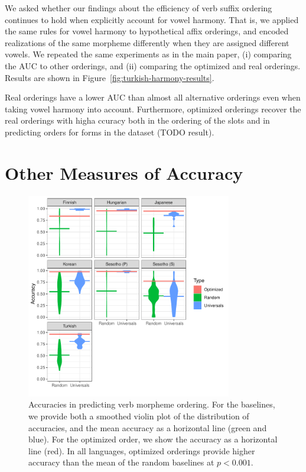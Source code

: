 \documentclass[11pt,letterpaper]{article}
\newcommand\mhahn[1]{{\color{red}(#1)}}
\begin{document}
We asked whether our findings about the efficiency of verb suffix ordering continues to hold when explicitly account for vowel harmony.
That is, we applied the same rules for vowel harmony to hypothetical affix orderings, and encoded realizations of the same morpheme differently when they are assigned different vowels.
We repeated the same experiments as in the main paper, (i) comparing the AUC to other orderings, and (ii) comparing the optimized and real orderings.
Results are shown in Figure~\ref{fig:turkish-harmony-results}.

Real orderings have a lower AUC than almost all alternative orderings even when taking vowel harmony into account.
Furthermore, optimized orderings recover the real orderings with higha ccuracy both in the ordering of the slots and in predicting orders for forms in the dataset \mhahn{TODO result}.


\section{Other Measures of Accuracy}



\begin{figure}[]
    \centering
\includegraphics[width=0.8\textwidth]{figures/accuracies_verbs.pdf}
    \caption{Accuracies in predicting verb morpheme ordering.
    For the baselines, we provide both a smoothed violin plot of the distribution of accuracies, and the mean accuracy as a horizontal line (green and blue). For the optimized order, we show the accuracy as a horizontal line (red).
    In all languages, optimized orderings provide higher accuracy than the mean of the random baselines at $p<0.001$.}
    \label{tab:optimized_acc_verbs}
\end{figure}





\end{document}
